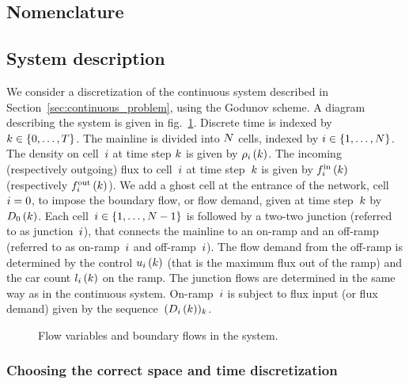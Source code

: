 
\subsection{Nomenclature}



\subsection{System description}

We consider a discretization of the continuous system described in Section~\ref{sec:continuous_problem}, using the Godunov scheme. A diagram describing the system is given in fig.~\ref{fig:system}. Discrete time is indexed by $k \in \{0, \dots, T \}$. The mainline is divided into $N$ cells, indexed by $i \in \{1, \dots, N\}$. The density on cell~$i$ at time step $k$ is given by $\rho_{i}\left(k\right)$. The incoming (respectively outgoing) flux to cell~$i$ at time step~$k$ is given by $f_{i}^{\text{in}}\left(k\right)$ (respectively $f_{i}^{\text{out}}\left(k\right)$). We add a ghost cell at the entrance of the network, cell $i = 0$, to impose the boundary flow, or flow demand, given at time step~$k$ by~$D_{0}\left(k\right)$. Each cell~$i \in \{1, \dots, N-1\}$ is followed by a two-two junction (referred to as junction~$i$), that connects the mainline to an on-ramp and an off-ramp (referred to as on-ramp~$i$ and off-ramp~$i$). The flow demand from the off-ramp is determined by the control $u_{i}\left(k\right)$ (that is the maximum flux out of the ramp) and the car count $l_{i}\left(k\right)$ on the ramp. The junction flows are determined in the same way as in the continuous system. On-ramp~$i$ is subject to flux input (or flux demand) given by the sequence~$(D_{i}\left(k\right))_{k}$.

\begin{figure}[h]
\centering
\resizebox{\columnwidth}{!}{}
\caption{Flow variables and boundary flows in the system.}
\label{fig:system}
\end{figure}

\subsubsection{Choosing the correct space and time discretization}

